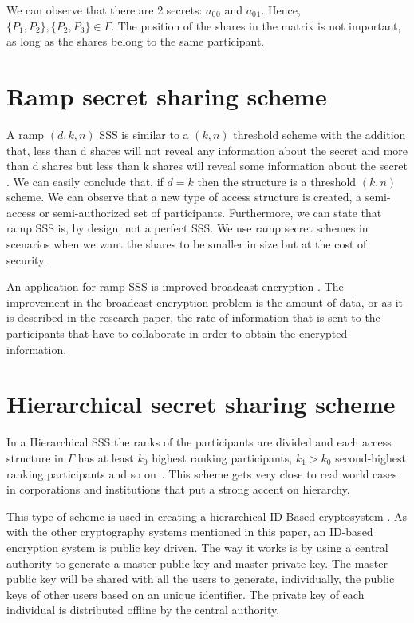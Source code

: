 \documentclass[12pt, a4paper, oneside]{book}
\begin{document}
    We can observe that there are 2 secrets: $a_0{_0}$ and $a_0{_1}$. Hence, $ \{P_1, P_2\}, \{P_2, P_3\} \in \Gamma $. The position of the shares in the matrix is not important, as long as the shares belong to the same participant.
    \section{Ramp secret sharing scheme}
    A ramp $(d, k, n)$ SSS is similar to a $(k, n)$ threshold scheme with the addition that, less than d shares will not reveal any information about the secret and more than d shares but less than k shares will reveal some information about the secret \cite{RampBlackleyMeadows}. We can easily conclude that, if $d{=}k$ then the structure is a threshold $(k,n)$ scheme. We can observe that a new type of access structure is created, a semi-access or semi-authorized set of participants. Furthermore, we can state that ramp SSS is, by design, not a perfect SSS. We use ramp secret schemes in scenarios when we want the shares to be smaller in size but at the cost of security\cite{RampBlackleyMeadows}.
    
    An application for ramp SSS is improved broadcast encryption \cite{RampImproved}. The improvement in the broadcast encryption problem is the amount of data, or as it is described in the research paper, the rate of information that is sent to the participants that have to collaborate in order to obtain the encrypted information.
    \section{Hierarchical secret sharing scheme}
    In a Hierarchical SSS the ranks of the participants are divided and each access structure in $\Gamma$ has at least $k_0$ highest ranking participants, $k_1{>}k_0$ second-highest ranking participants and so on~\cite{HierarchicalT}. This scheme gets very close to real world cases in corporations and institutions that put a strong accent on hierarchy.
    
    This type of scheme is used in creating a hierarchical ID-Based cryptosystem \cite{H_ID}. As with the other cryptography systems mentioned in this paper, an ID-based encryption system is public key driven. The way it works is by using a central authority to generate a master public key and master private key. The master public key will be shared with all the users to generate, individually, the public keys of other users based on an unique identifier. The private key of each individual is distributed offline by the central authority.
\end{document}
